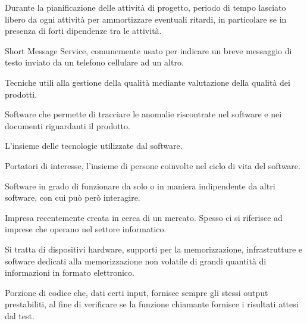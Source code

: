 Durante la pianificazione delle attività di progetto, periodo di tempo lasciato libero da ogni attività per ammortizzare eventuali ritardi, in particolare se in presenza di forti dipendenze tra le attività.


Short Message Service, comunemente usato per indicare un breve messaggio di testo inviato da un telefono cellulare ad un altro. \\


Tecniche utili alla gestione della qualità mediante valutazione della qualità dei prodotti. \\


Software che permette di tracciare le anomalie riscontrate nel software e nei documenti riguardanti il prodotto. \\


L'insieme delle tecnologie utilizzate dal software. \\


Portatori di interesse, l'insieme di persone coinvolte nel ciclo di vita del software. \\


Software in grado di funzionare da solo o in maniera indipendente da altri software, con cui può però interagire. \\


Impresa recentemente creata in cerca di un mercato. Spesso ci si riferisce ad imprese che operano nel settore informatico. \\


Si tratta di dispositivi hardware, supporti per la memorizzazione, infrastrutture e software dedicati alla memorizzazione non volatile di grandi quantità di informazioni in formato elettronico. \\


Porzione di codice che, dati certi input, fornisce sempre gli stessi output prestabiliti, al fine di verificare se la funzione
chiamante fornisce i risultati attesi dal test. \\

